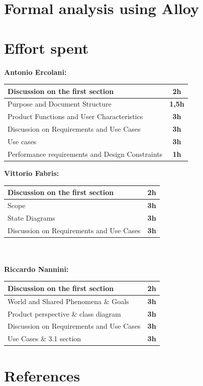 \documentclass[]{article}
\begin{document}
		
	\section{Formal analysis using Alloy}
	
	\newpage
	
	\section{Effort spent}
	
	\medskip
	\textbf{\large Antonio Ercolani:} \\ \newline
	\begin{tabular}{|l|c|}
		\hline
		Discussion on the first section &  \textbf{2h} \\ \hline
		\rowcolor[HTML]{DCDCDC} 
		Purpose and Document Structure & \textbf{1,5h} \\ \hline
		Product Functions and User Characteristics & \textbf{3h} \\ \hline
		\rowcolor[HTML]{DCDCDC}
		Discussion on Requirements and Use Cases & \textbf{3h} \\ \hline
		Use cases & \textbf{3h} \\ \hline
		\rowcolor[HTML]{DCDCDC}
		Performance requirements and Design Constraints & \textbf{1h} \\ \hline
	\end{tabular}
	
	
	\textbf{} \newline
	\textbf{} \newline

	\textbf{\large Vittorio Fabris:} \\ \newline
		\begin{tabular}{|l|c|}
			\hline
			Discussion on the first section &  \textbf{2h} \\ \hline
			\rowcolor[HTML]{DCDCDC} 
			Scope & \textbf{3h} \\ \hline
			State Diagrams & \textbf{3h} \\ \hline
			\rowcolor[HTML]{DCDCDC} 
			Discussion on Requirements and Use Cases & \textbf{3h} \\ \hline
		\end{tabular}
		
		

	
	\textbf{\large \\ \\ Riccardo Nannini:} \\ \newline
		\begin{tabular}{|l|c|}
			\hline
			Discussion on the first section &  \textbf{2h} \\ \hline
			\rowcolor[HTML]{DCDCDC} 
			World and Shared Phenomena \& Goals & \textbf{3h} \\ \hline
			Product perspective \& class diagram & \textbf{3h} \\ \hline
			\rowcolor[HTML]{DCDCDC} 
			Discussion on Requirements and Use Cases & \textbf{3h} \\ \hline
			Use Cases \& 3.1 section & \textbf{3h} \\ \hline
		\end{tabular}
	
	\section{References}				
\end{document}

